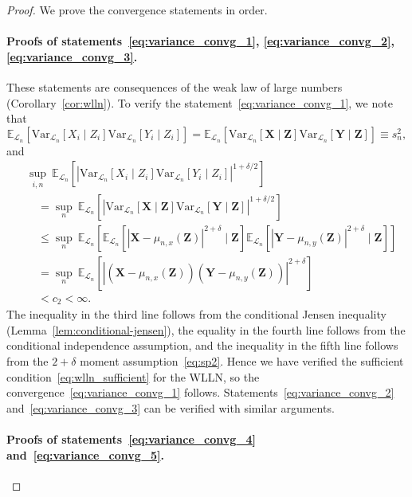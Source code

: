 \documentclass[aos]{imsart}
\theoremstyle{plain}
\theoremstyle{remark}
\newcommand{\E}{\mathbb E}								%
\newcommand{\V}{\mathrm{Var}}							%
\newcommand{\prx}{\bm X}								%
\newcommand{\srx}{X}									%
\newcommand{\prz}{\bm Z}								%
\newcommand{\srz}{Z}									%
\newcommand{\pry}{{\bm Y}}								%
\newcommand{\sry}{Y}									%
\newcommand{\law}{\mathcal L}							%
\begin{document}
\begin{proof}

	We prove the convergence statements in order.

\paragraph*{Proofs of statements~\eqref{eq:variance_convg_1}, \eqref{eq:variance_convg_2}, \eqref{eq:variance_convg_3}.}

These statements are consequences of the weak law of large numbers (Corollary~\ref{cor:wlln}). To verify the statement~\eqref{eq:variance_convg_1}, we note that
\begin{equation*}
	\E_{\law_n}[\V_{\law_n}[\srx_i\mid \srz_i]\V_{\law_n}[\sry_i \mid \srz_i]] = \E_{\law_n}[\V_{\law_n}[\prx\mid \prz]\V_{\law_n}[\pry \mid \prz]] \equiv s^2_n, 
\end{equation*}
and
\begin{equation}
	\begin{split}
	&\sup_{i,n} \ \E_{\law_n}[|\V_{\law_n}[\srx_i\mid \srz_i]\V_{\law_n}[\sry_i \mid \srz_i]|^{1+\delta/2}] \\
	&\quad= \sup_n\ \E_{\law_n}[|\V_{\law_n}[\prx\mid \prz]\V_{\law_n}[\pry \mid \prz]|^{1+\delta/2}] \\
	&\quad\leq \sup_n\ \E_{\law_n}[\E_{\law_n}[|\prx - \mu_{n,x}(\prz)|^{2+\delta} \mid \prz]\E_{\law_n}[|\pry - \mu_{n,y}(\prz)|^{2+\delta} \mid \prz]] \\
	&\quad= \sup_n\ \E_{\law_n}[|(\prx - \mu_{n,x}(\prz))(\pry - \mu_{n,y}(\prz))|^{2 + \delta}] \\
	&\quad< c_2 < \infty.
	\end{split}
	\label{eq:variance-bound-derivation}
\end{equation}
The inequality in the third line follows from the conditional Jensen inequality (Lemma~\ref{lem:conditional-jensen}), the equality in the fourth line follows from the conditional independence assumption, and the inequality in the fifth line follows from the $2+\delta$ moment assumption~\eqref{eq:sp2}. Hence we have verified the sufficient condition~\eqref{eq:wlln_sufficient} for the WLLN, so the convergence~\eqref{eq:variance_convg_1} follows. Statements~\eqref{eq:variance_convg_2} and~\eqref{eq:variance_convg_3} can be verified with similar arguments.

\paragraph*{Proofs of statements~\eqref{eq:variance_convg_4} and~\eqref{eq:variance_convg_5}.} 


\end{proof}
\end{document}

